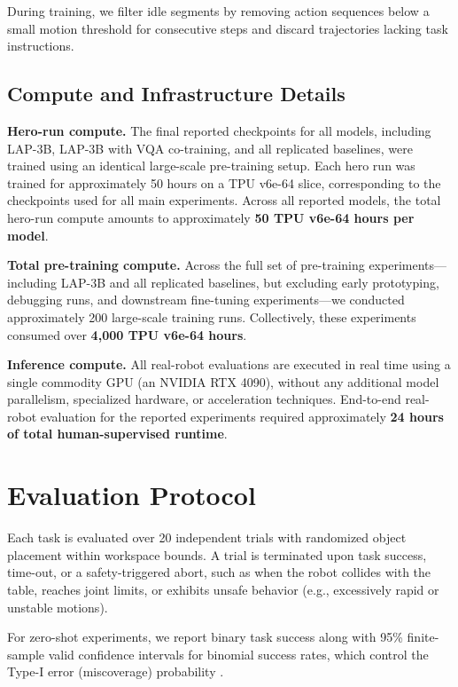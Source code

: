 During training, we filter idle segments by removing action sequences below a small motion threshold for consecutive steps and discard trajectories lacking task instructions.

\subsection{Compute and Infrastructure Details}
\label{app:compute}

\noindent\textbf{Hero-run compute.}
The final reported checkpoints for all models, including \textsc{LAP-3B}, \textsc{LAP-3B} with VQA co-training, and all replicated baselines, were trained using an identical large-scale pre-training setup. Each hero run was trained for approximately 50 hours on a TPU v6e-64 slice, corresponding to the checkpoints used for all main experiments. Across all reported models, the total hero-run compute amounts to approximately \textbf{50 TPU v6e-64 hours per model}.

\medskip
\noindent\textbf{Total pre-training compute.}
Across the full set of pre-training experiments—including \textsc{LAP-3B} and all replicated baselines, but excluding early prototyping, debugging runs, and downstream fine-tuning experiments—we conducted approximately 200 large-scale training runs. Collectively, these experiments consumed over \textbf{4,000 TPU v6e-64 hours}.

\medskip
\noindent\textbf{Inference compute.}
All real-robot evaluations are executed in real time using a single commodity GPU (an NVIDIA RTX 4090), without any additional model parallelism, specialized hardware, or acceleration techniques. End-to-end real-robot evaluation for the reported experiments required approximately \textbf{24 hours of total human-supervised runtime}.



\section{Evaluation Protocol}
\label{app:evaluation_details}

Each task is evaluated over 20 independent trials with randomized object placement within workspace bounds. A trial is terminated upon task success, time-out, or a safety-triggered abort, such as when the robot collides with the table, reaches joint limits, or exhibits unsafe behavior (e.g., excessively rapid or unstable motions).

For zero-shot experiments, we report binary task success along with 95\% finite-sample valid confidence intervals for binomial success rates, which control the Type-I error (miscoverage) probability \cite{vincent2024generalizablebehaviorcloningpolicy}.

